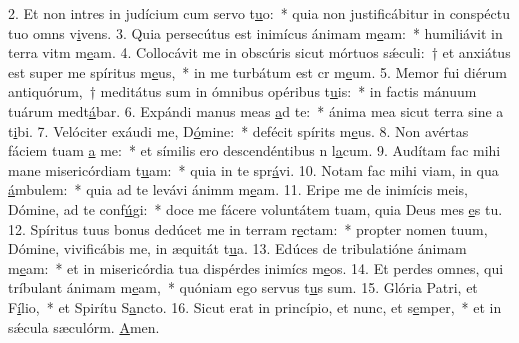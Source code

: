 2. Et non intres in judícium cum servo t\uline{u}o:~* quia non justificábitur in conspéctu tuo omns v\uline{i}vens.
3. Quia persecútus est inimícus ánimam m\uline{e}am:~* humiliávit in terra vitm m\uline{e}am.
4. Collocávit me in obscúris sicut mórtuos sǽculi:~† et anxiátus est super me spíritus m\uline{e}us,~* in me turbátum est cr m\uline{e}um.
5. Memor fui diérum antiquórum,~† meditátus sum in ómnibus opéribus t\uline{u}is:~* in factis mánuum tuárum medt\uline{á}bar.
6. Expándi manus meas \uline{a}d te:~* ánima mea sicut terra sine a t\uline{i}bi.
7. Velóciter exáudi me, D\uline{ó}mine:~* defécit spírits m\uline{e}us.
8. Non avértas fáciem tuam \uline{a} me:~* et símilis ero descendéntibus n l\uline{a}cum.
9. Audítam fac mihi mane misericórdiam t\uline{u}am:~* quia in te spr\uline{á}vi.
10. Notam fac mihi viam, in qua \uline{á}mbulem:~* quia ad te levávi ánimm m\uline{e}am.
11. Eripe me de inimícis meis, Dómine, ad te conf\uline{ú}gi:~* doce me fácere voluntátem tuam, quia Deus mes \uline{e}s tu.
12. Spíritus tuus bonus dedúcet me in terram r\uline{e}ctam:~* propter nomen tuum, Dómine, vivificábis me, in æquitát t\uline{u}a.
13. Edúces de tribulatióne ánimam m\uline{e}am:~* et in misericórdia tua dispérdes inimícs m\uline{e}os.
14. Et perdes omnes, qui tríbulant ánimam m\uline{e}am,~* quóniam ego servus t\uline{u}s sum.
15. Glória Patri, et F\uline{í}lio,~* et Spirítu S\uline{a}ncto.
16. Sicut erat in princípio, et nunc, et s\uline{e}mper,~* et in sǽcula sæculórm. \uline{A}men.
